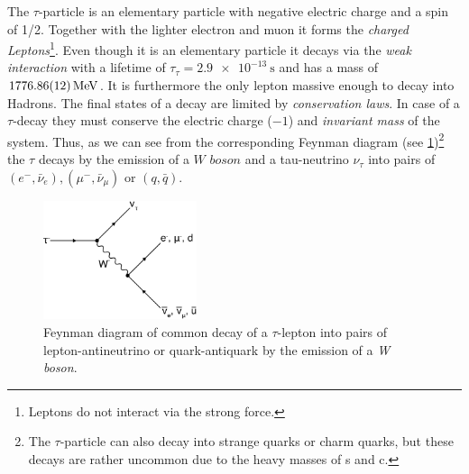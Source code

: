 \documentclass[../../index.tex]{subfiles}
\begin{document}
The $\tau$-particle is an elementary particle with negative electric charge and a
spin of 1/2. Together with the lighter electron and muon it forms the
\textit{charged Leptons}\footnote{Leptons do not interact via the strong force.}.
Even though it is an elementary particle it decays via the \textit{weak
  interaction} with a lifetime of $\tau_\tau=\SI{2.9e-13}{\second}$ and has a mass
of $\SI{1776.86\pm0.12}{\mega\electronvolt}$\cite{PDG2018}. It is furthermore the only
lepton massive enough to decay into Hadrons.
The final states of a decay are limited by \textit{conservation laws}. In case
of a $\tau$-decay they must conserve the electric charge ($-1$) and
\textit{invariant mass} of the system. Thus, as we can see from
the corresponding Feynman diagram
(see \cref{fig:tauDecay})\footnote{The $\tau$-particle can also decay into strange
  quarks or charm quarks, but these decays are rather uncommon due to the heavy
  masses of s and c.} the $\tau$ decays by the emission of a $\textit{W boson}$
and a tau-neutrino $\nu_\tau$ into pairs of $(e^-, \bar\nu_e), (\mu^-,
\bar\nu_\mu)$ or $(q, \bar q)$.
\begin{figure}[h]
  \centering
  \includegraphics[width=0.4\textwidth]{images/tauDecay.eps}
  \caption{Feynman diagram of common decay of a $\tau$-lepton into pairs of
    lepton-antineutrino or quark-antiquark by the emission of a \textit{W boson}.}
  \label{fig:tauDecay}
\end{figure}
\end{document}
